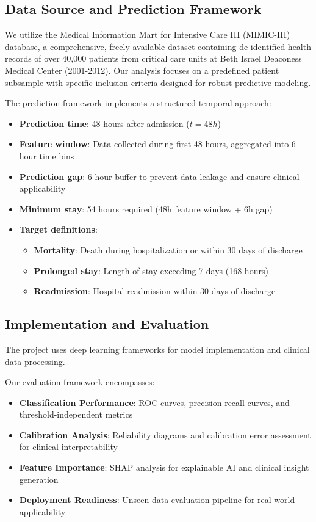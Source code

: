 \documentclass[11pt]{article}
\begin{document}
\subsection{Data Source and Prediction Framework}

We utilize the Medical Information Mart for Intensive Care III (MIMIC-III) database, a comprehensive, freely-available dataset containing de-identified health records of over 40,000 patients from critical care units at Beth Israel Deaconess Medical Center (2001-2012). Our analysis focuses on a predefined patient subsample with specific inclusion criteria designed for robust predictive modeling.

The prediction framework implements a structured temporal approach:

\begin{itemize}
    \item \textbf{Prediction time}: 48 hours after admission ($t = 48h$)
    \item \textbf{Feature window}: Data collected during first 48 hours, aggregated into 6-hour time bins
    \item \textbf{Prediction gap}: 6-hour buffer to prevent data leakage and ensure clinical applicability
    \item \textbf{Minimum stay}: 54 hours required (48h feature window + 6h gap)
    \item \textbf{Target definitions}:
    \begin{itemize}
        \item \textbf{Mortality}: Death during hospitalization or within 30 days of discharge
        \item \textbf{Prolonged stay}: Length of stay exceeding 7 days (168 hours)
        \item \textbf{Readmission}: Hospital readmission within 30 days of discharge
    \end{itemize}
\end{itemize}

\subsection{Implementation and Evaluation}

The project uses deep learning frameworks for model implementation and clinical data processing.

Our evaluation framework encompasses:
\begin{itemize}
    \item \textbf{Classification Performance}: ROC curves, precision-recall curves, and threshold-independent metrics
    \item \textbf{Calibration Analysis}: Reliability diagrams and calibration error assessment for clinical interpretability
    \item \textbf{Feature Importance}: SHAP analysis for explainable AI and clinical insight generation
    \item \textbf{Deployment Readiness}: Unseen data evaluation pipeline for real-world applicability
\end{itemize}
\end{document}
